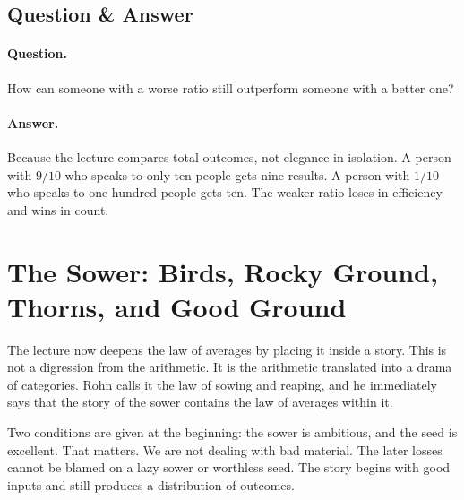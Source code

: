\subsection{Question \& Answer}

\paragraph{Question.} How can someone with a worse ratio still outperform someone with a better one?

\paragraph{Answer.} Because the lecture compares total outcomes, not elegance in isolation. A person with \(9/10\) who speaks to only ten people gets nine results. A person with \(1/10\) who speaks to one hundred people gets ten. The weaker ratio loses in efficiency and wins in count.

\section{The Sower: Birds, Rocky Ground, Thorns, and Good Ground}

The lecture now deepens the law of averages by placing it inside a story. This is not a digression from the arithmetic. It is the arithmetic translated into a drama of categories. Rohn calls it the law of sowing and reaping, and he immediately says that the story of the sower contains the law of averages within it.

Two conditions are given at the beginning: the sower is ambitious, and the seed is excellent. That matters. We are not dealing with bad material. The later losses cannot be blamed on a lazy sower or worthless seed. The story begins with good inputs and still produces a distribution of outcomes.

